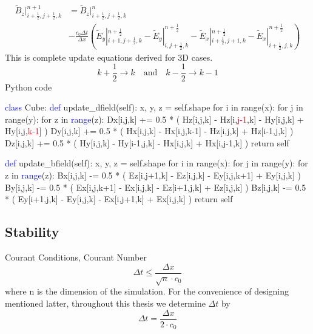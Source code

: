 \begin{equation}
  \begin{split}
    \widetilde{B}_z|_{i+\frac{1}{2},j+\frac{1}{2},k}^{n+1} & = \widetilde{B}_z|_{i+\frac{1}{2},j+\frac{1}{2},k}^{n}\\
    & - \frac{c_0\Delta t}{\Delta x}\left(\widetilde{E}_y|_{i+1,j+\frac{1}{2},k}^{n+\frac{1}{2}} - \widetilde{E}_y|_{i,j+\frac{1}{2},k}^{n+\frac{1}{2}} - \widetilde{E}_x|_{i+\frac{1}{2},j+1,k}^{n+\frac{1}{2}} - \widetilde{E}_x|_{i+\frac{1}{2},j,k}^{n+\frac{1}{2}}\right)
  \end{split}
\end{equation}
This is complete update equations derived for 3D cases.
\begin{equation}
  k+\frac{1}{2}\rightarrow k\quad \mathrm{and} \quad
  k-\frac{1}{2}\rightarrow k-1
\end{equation}
Python code
\begin{code}
\textcolor{blue}{class} Cube:
    \textcolor{blue}{def} update\_dfield(self):
        x, y, z = self.shape
        for i in range(x):
            for j in range(y):
                for z in \textcolor{blue}{range}(z):
                    Dx[i,j,k] += 0.5 * ( Hz[i,j,k] - Hz[i,\textcolor{red}{j-1},k] 
                                       - Hy[i,j,k] + Hy[i,j,\textcolor{red}{k-1}] )
                    Dy[i,j,k] += 0.5 * ( Hx[i,j,k] - Hx[i,j,k-1] 
                                       - Hz[i,j,k] + Hz[i-1,j,k] )
                    Dz[i,j,k] += 0.5 * ( Hy[i,j,k] - Hy[i-1,j,k] 
                                       - Hx[i,j,k] + Hx[i,j-1,k] )
    return self

    \textcolor{blue}{def} update\_bfield(self):
        x, y, z = self.shape
        for i in range(x):
            for j in range(y):
                for z in \textcolor{blue}{range}(z):
                    Bx[i,j,k] -= 0.5 * ( Ez[i,j+1,k] - Ez[i,j,k] 
                                       - Ey[i,j,k+1] + Ey[i,j,k] )
                    By[i,j,k] -= 0.5 * ( Ex[i,j,k+1] - Ex[i,j,k] 
                                       - Ez[i+1,j,k] + Ez[i,j,k] )
                    Bz[i,j,k] -= 0.5 * ( Ey[i+1,j,k] - Ey[i,j,k] 
                                       - Ex[i,j+1,k] + Ex[i,j,k] )
        return self
\end{code}


\subsection{Stability}
Courant Conditions, Courant Number
\begin{equation}
  \Delta t \le \frac{\Delta x}{\sqrt{n}\cdot c_0}
\end{equation}
where n is the dimension of the simulation. For the convenience of designing mentioned latter, throughout this thesis we determine
$\Delta t$ by
\begin{equation}
  \Delta t = \frac{\Delta x}{2 \cdot c_0}
\end{equation}


